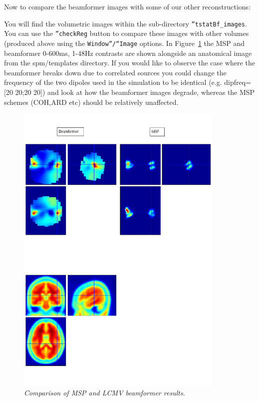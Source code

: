 Now to compare the beamformer images with some of our other reconstructions:

You will find the volumetric images within the sub-directory \texttt{''tstatBf\_images}. You can use the \texttt{''checkReg} button to compare these images with other volumes (produced above using the \texttt{Window''/``Image} options. In Figure~\ref{meg_sloc:fig:12} the MSP and beamformer 0-600ms, 1-48Hz contrasts are shown alongside an anatomical image from the spm/templates directory.
If you would like to observe the case where the beamformer breaks down due to correlated sources you could change the frequency of the two dipoles used in the simulation to be identical (e.g. dipfreq=[20 20;20 20]) and look at how the beamformer images  degrade, whereas the MSP schemes (COH,ARD etc) should be relatively unaffected.

\begin{figure}
\begin{center}
\includegraphics[width=100mm]{meg_sloc/slide12}
\caption{\em Comparison of MSP and LCMV beamformer results.\label{meg_sloc:fig:12}}
\end{center}
\end{figure}

